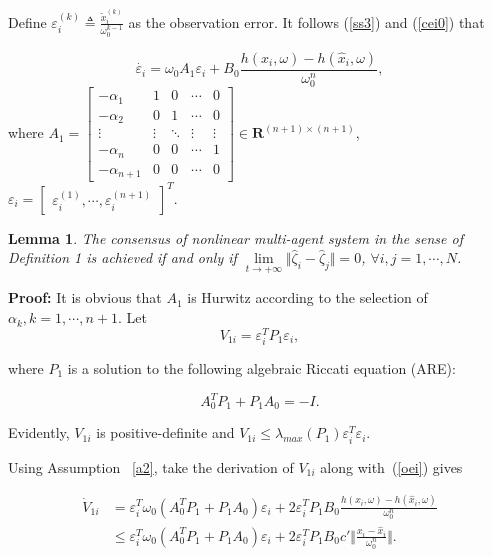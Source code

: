 \documentclass[english]{cccconf}
\newtheorem{lemma}{Lemma}
\begin{document}
Define $\varepsilon_i^{(k)} \triangleq \frac{\tilde x_i^{(k)}}{\omega_0^{k-1}} $ as the observation error. It follows (\ref{ss3}) and (\ref{cei0}) that

\begin{equation}
  \label{oei}
  \dot {\varepsilon_i} =\omega_0 A_1 \varepsilon_i + B_0 \frac{h(x_i,\omega)-h(\hat x_i,\omega)}{\omega_0^n},
\end{equation} where $A_{1}=\begin{bmatrix} -\alpha_1 & 1 & 0 & \cdots & 0\\ -\alpha_2 & 0 & 1 & \cdots & 0\\ \vdots & \vdots & \ddots & \vdots & \vdots \\ -\alpha_n & 0 & 0 & \cdots & 1\\ -\alpha_{n+1} & 0 & 0 & \cdots & 0 \end{bmatrix} \in \mathbf R^{(n+1) \times (n+1)}$, $\varepsilon_i = \begin{bmatrix} \varepsilon_i^{(1)}, \cdots, \varepsilon_i^{(n+1)} \end{bmatrix}^T$.

\begin{lemma}\label{OberverErrors}
The consensus of nonlinear multi-agent system in the sense of Definition 1 is achieved if and only if $\mathop{lim}\limits_{t \to +\infty} \Vert \hat \zeta_i - \hat \zeta_j \Vert = 0$, $\forall i, j=1,\cdots, N$.
\end{lemma}

\textbf{Proof:} It is obvious that $A_1$ is Hurwitz according to the selection of $\alpha_k, k=1,\cdots, n+1$. 
Let \begin{equation} 
\label{V1i}
V_{1i}=\varepsilon^T_i P_1 \varepsilon_i, 
 \end{equation}
 
 where $P_1$ is a solution to the following algebraic Riccati equation (ARE):
 
 \begin{equation}
\label{t1}
A_0^T P_1 + P_1 A_0 = -I.  
\end{equation}

Evidently, $V_{1i}$ is positive-definite and $V_{1i} \le \lambda_{max}(P_1) \varepsilon^T_i \varepsilon_i$.

 
Using Assumption ~\ref{a2}, take the derivation of $V_{1i}$ along with~(\ref{oei}) gives

\begin{equation}
\label{V1i_dot}
\begin{align}
\dot V_{1i} &= \varepsilon^T_i \omega_0 (A_0^T P_1 + P_1 A_0) \varepsilon_i + 2 \varepsilon^T_i P_1 B_0 \frac{h(x_i,\omega)-h(\hat x_i,\omega)}{\omega_0^n} \\ & \le \varepsilon^T_i \omega_0 (A_0^T P_1 + P_1 A_0) \varepsilon_i + 2 \varepsilon^T_i P_1 B_0 c' \Vert \frac{x_i- \hat x_i}{\omega_0^n} \Vert.  
\end{align}  
\end{equation}
\end{document}
